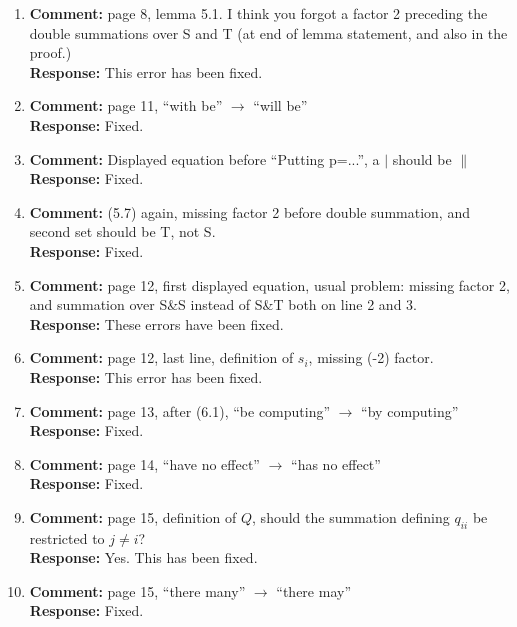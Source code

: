 \documentclass[a4paper,10pt]{article}
\begin{document}
\begin{enumerate}

\item\textbf{Comment:}  
page 8, lemma 5.1. I think you forgot a factor 2 preceding the double summations over S and T (at end of lemma statement, and also in the proof.) 
\\\textbf{Response:}
This error has been fixed.

\item\textbf{Comment:}  
page 11, ``with be'' $\to$ ``will be'' 
\\\textbf{Response:}
Fixed.

\item\textbf{Comment:}  
Displayed equation before ``Putting p=...'', a $|$ should be $\|$
\\\textbf{Response:}
Fixed.

\item\textbf{Comment:}  
(5.7) again, missing factor 2 before double summation, and second set should be T, not S. 
\\\textbf{Response:}
Fixed.

\item\textbf{Comment:}  
page 12, first displayed equation, usual problem: missing factor 2, and summation over S\&S instead of S\&T both on line 2 and 3. 
\\\textbf{Response:}
These errors have been fixed.

\item\textbf{Comment:}  
page 12, last line, definition of $s_i$, missing (-2) factor. 
\\\textbf{Response:}
This error has been fixed.

\item\textbf{Comment:}  
page 13, after (6.1), ``be computing'' $\to$ ``by computing'' 
\\\textbf{Response:}
Fixed.

\item\textbf{Comment:}  
page 14, ``have no effect'' $\to$ ``has no effect'' 
\\\textbf{Response:}
Fixed.

\item\textbf{Comment:}  
page 15, definition of $Q$, should the summation defining $q_{ii}$ be restricted to $j\neq i$? 
\\\textbf{Response:}
Yes. This has been fixed.

\item\textbf{Comment:}  
page 15, ``there many'' $\to$ ``there may'' 
\\\textbf{Response:}
Fixed.


\end{enumerate}
\end{document}

